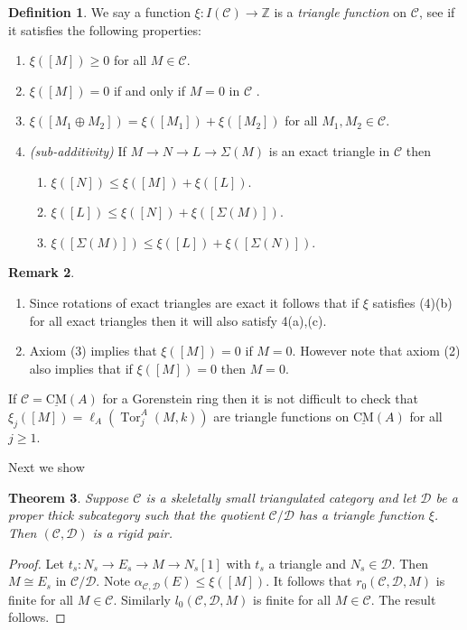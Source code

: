 \documentclass{amsart}
\newcommand{\D}{\mathcal{D} }
\newcommand{\Z}{\mathbb{Z} }
\newcommand{\C}{\mathcal{C}}
\newcommand{\rt}{\rightarrow}
\newcommand{\CMS}{\operatorname{\underline{CM}}}
\newcommand{\Tor}{\operatorname{Tor}}
\theoremstyle{plain}
\newtheorem{theorem}{Theorem}[section]
\theoremstyle{definition}
\newtheorem{definition}[theorem]{Definition}
\newtheorem{remark}[theorem]{Remark}
\theoremstyle{remark}
\begin{document}
{\begin{definition}
We say a function $\xi \colon I(\C) \rt \Z$ is a \emph{triangle
 function} on $\C$, see \cite[Introduction]{P-liason} if it satisfies the following properties:
\begin{enumerate}
\item
$\xi([M]) \geq 0$ for all $M \in \C$.
\item
$\xi([M]) = 0$ if and only if $M = 0$ in $\C$ .
\item
$\xi([M_1 \oplus M_2]) = \xi([M_1]) + \xi([M_2])$ for all $M_1, M_2 \in \C$.
\item
\emph{
(sub-additivity)} If $M \rt N \rt L \rt \Sigma (M)$ is an exact triangle in $\C$ then
\begin{enumerate}
\item
$\xi([N]) \leq \xi([M]) + \xi([L])$.
\item
$\xi([L]) \leq \xi([N]) + \xi([\Sigma(M)])$.
\item
$\xi([\Sigma(M)]) \leq \xi([L]) + \xi([\Sigma(N)])$.
\end{enumerate}
\end{enumerate}
\end{definition}
\begin{remark}\label{rotation}
\begin{enumerate}[\rm (i)]
\item
Since rotations of exact triangles are exact it follows that if $\xi$ satisfies (4)(b) for all exact triangles then it will also satisfy 4(a),(c).
\item
Axiom (3) implies that $\xi([M]) = 0$ if $M = 0$. However note that axiom (2) also implies that if $\xi([M]) = 0$ then $M = 0$.
\end{enumerate}
\end{remark}

\s If $\C = \CMS(A)$ for a Gorenstein ring then it is not difficult to check that $\xi_j([M]) = \ell_A(\Tor^A_j(M, k))$ are triangle functions on $\CMS(A)$ for all $j \geq 1$.

Next we show
\begin{theorem}
\label{infy}
Suppose $\C$ is a skeletally small triangulated category and let $\D$ be a proper thick subcategory such that the quotient $\C/\D$ has a triangle function $\xi$. Then $(\C, \D)$ is a rigid pair.
\end{theorem}
\begin{proof}
Let $t_s  \colon N_s \rt E_s \rt M \rt N_s[1]$
 with $ t_s$   a triangle and $ N_s \in \D$. Then  $M \cong E_s$ in $\C/\D$. Note $\alpha_{\C, \D}(E) \leq \xi([M]) $. It follows that $r_0(\C,\D, M)$ is finite for all $M \in \C$. Similarly $l_0(\C,\D, M)$ is finite for all $M \in \C$. The result follows.
\end{proof}



}
\end{document}

